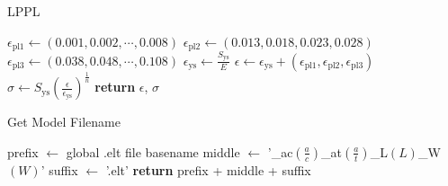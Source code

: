 \documentclass{article}
\begin{document}
\begin{algorithm}
  \caption{LPPL}
  \label{lppl}
  \begin{algorithmic}
    \State $\epsilon_{\text{pl1}} \gets (0.001, 0.002, \cdots , 0.008)$
    \State $\epsilon_{\text{pl2}} \gets (0.013, 0.018, 0.023, 0.028)$
    \State $\epsilon_{\text{pl3}} \gets (0.038, 0.048, \cdots , 0.108)$
    \State $\epsilon_{\text{ys}} \gets \frac{S_{\text{ys}}}{E}$
    \State $\epsilon \gets \epsilon_{\text{ys}} + (\epsilon_{\text{pl1}}, \epsilon_{\text{pl2}}, \epsilon_{\text{pl3}})$
    \State $\sigma \gets S_{\text{ys}}  (\frac{\epsilon}{\epsilon_{\text{ys}}})^{\frac{1}{n}}$
    \State \textbf{return} $\epsilon$, $\sigma$
    \EndProcedure
  \end{algorithmic}
\end{algorithm}

\begin{algorithm}
  \caption{Get Model Filename}
  \label{get_model_filename}
  \begin{algorithmic}
      \State prefix $\gets$ global .elt file basename 
      \State middle $\gets$ '\_ac$(\frac{a}{c})$\_at$(\frac{a}{t})$\_L$(L)$\_W$(W)$'
      \State suffix $\gets$ '.elt'
      \State \textbf{return} prefix + middle + suffix 
    \EndProcedure
  \end{algorithmic}
\end{algorithm}
\end{document}
